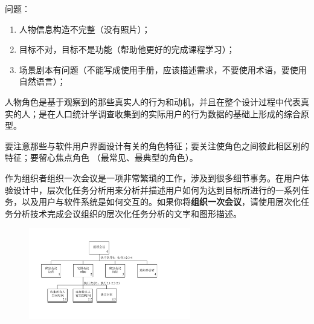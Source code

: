 \begin{solution}
问题：
\begin{enumerate}[label=\arabic*.]
    \item 人物信息构造不完整（没有照片）；
    \item 目标不对，目标不是功能（帮助他更好的完成课程学习）；
    \item 场景剧本有问题（不能写成使用手册，应该描述需求，不要使用术语，要使用自然语言）；
\end{enumerate}

人物角色是基于观察到的那些真实人的行为和动机，并且在整个设计过程中代表真实的人；是在人口统计学调查收集到的实际用户的行为数据的基础上形成的综合原型。

要注意那些与软件用户界面设计有关的角色特征；要关注使角色之间彼此相区别的特征；要留心焦点角色 （最常见、最典型的角色）。
\end{solution}



\begin{problem}
作为组织者组织一次会议是一项非常繁琐的工作，涉及到很多细节事务。在用户体验设计中，层次化任务分析用来分析并描述用户如何为达到目标所进行的一系列任务，以及用户与软件系统是如何交互的。如果你将\textbf{组织一次会议}，请使用层次化任务分析技术完成会议组织的层次化任务分析的文字和图形描述。
\end{problem}

\begin{solution}
\begin{figure}[H]
    \vspace{-0.5em}
	\centering
	\includegraphics[width=0.63\textwidth]{3.pdf}
    \vspace{-1em}
\end{figure}
\end{solution}



